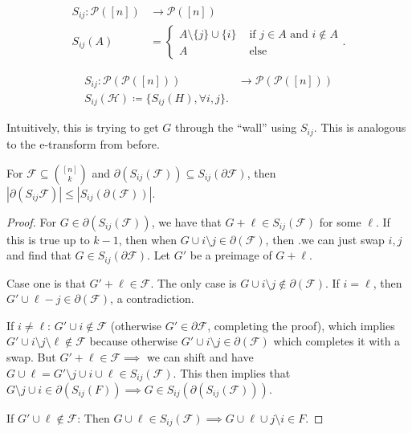 \documentclass[a4paper]{article}
\begin{document}
\begin{definition}
	\begin{align*}
		S_{ij}: \mathcal{P}([n]) &\longrightarrow  \mathcal{P}([n])\\
		S_{ij}(A) &=
		\begin{cases}
			A \setminus \{j\} \cup \{i\}  & \text{ if $j \in A $ and $i \not\in A $}\\
			A & \text{ else}
		\end{cases}
	.\end{align*}

	\begin{align*}
		S_{ij}: \mathcal{P}(\mathcal{P}([n])) &\longrightarrow \mathcal{P}(\mathcal{P}([n]))\\
		S_{ij}(\mathcal{H}) \coloneqq \{S_{ij}(H), \forall i,j\}
	.\end{align*}

	Intuitively, this is trying to get $G $ through the ``wall'' using $S_{ij} $.
	This is analogous to the e-transform from before.
\end{definition}

\begin{lem}
	For $\mathcal{F} \subseteq \binom{[n]}{k} $ and $\partial(S_{ij}(\mathcal{F})) \subseteq S_{ij}(\partial \mathcal{F}) $, then $|\partial (S_{ij}\mathcal{F})| \le |S_{ij}(\partial(\mathcal{F}))|$.
\end{lem}

\begin{proof}
	For $G \in \partial(S_{ij}(\mathcal{F}))$, we have that $G + \ell \in S_{ij}(\mathcal{F}) $ for some $\ell $.
	If this is true up to $k-1 $, then when $G \cup i \setminus j \in \partial(\mathcal{F}) $, then .we can just swap $i,j $ and find that $G \in S_{ij}(\partial \mathcal{F}) $.
	Let $G' $ be a preimage of $G + \ell $.

	Case one is that $G' + \ell\in \mathcal{F} $.
	The only case is $G \cup i \setminus j \not\in \partial (\mathcal{F}) $.
	If $i = \ell $, then $G' \cup \ell -j \in \partial(\mathcal{F}) $, a contradiction.

	If $i \ne \ell$: $G' \cup i \not\in \mathcal{F} $ (otherwise $G' \in\partial \mathcal{F} $, completing the proof), which implies $G' \cup i \setminus j \setminus \ell \not\in \mathcal{F}$ because otherwise $G'\cup i \setminus j \in \partial(\mathcal{F})$ which completes it with a swap.
	But $G' + \ell\in \mathcal{F} \implies $ we can shift and have $G \cup \ell=G' \setminus j \cup i \cup \ell \in S_{ij}(\mathcal{F}) $.
	This then implies that $G \setminus j \cup i \in \partial(S_{ij}(F)) \implies G \in S_{ij}(\partial(S_{ij}(\mathcal{F}))) $.

	If $G' \cup \ell\not\in \mathcal{F} $: Then $G \cup \ell \in S_{ij}(\mathcal{F}) \implies G \cup \ell \cup j \setminus i \in F $.
\end{proof}
\end{document}
